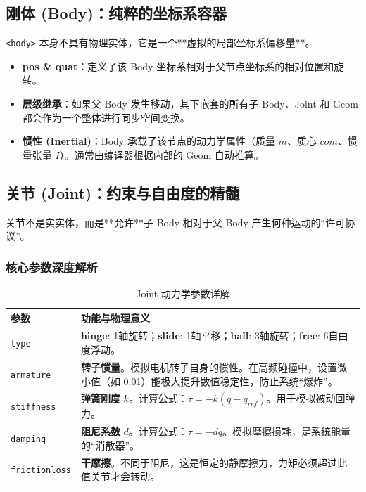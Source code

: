 \documentclass[11pt,a4paper]{book}
\begin{document}
\subsection{刚体 (Body)：纯粹的坐标系容器}
\texttt{<body>} 本身不具有物理实体，它是一个**虚拟的局部坐标系偏移量**。
\begin{itemize}
    \item \textbf{pos \& quat}：定义了该 Body 坐标系相对于父节点坐标系的相对位置和旋转。
    \item \textbf{层级继承}：如果父 Body 发生移动，其下嵌套的所有子 Body、Joint 和 Geom 都会作为一个整体进行同步空间变换。
    \item \textbf{惯性 (Inertial)}：Body 承载了该节点的动力学属性（质量 $m$、质心 $com$、惯量张量 $I$）。通常由编译器根据内部的 Geom 自动推算。
\end{itemize}



\subsection{关节 (Joint)：约束与自由度的精髓}
关节不是实实体，而是**允许**子 Body 相对于父 Body 产生何种运动的“许可协议”。

\subsubsection{核心参数深度解析}

\begin{longtable}{lp{10cm}}
\caption{Joint 动力学参数详解} \\
\toprule
\textbf{参数} & \textbf{功能与物理意义} \\ \midrule
\texttt{type} & \textbf{hinge}: 1轴旋转；\textbf{slide}: 1轴平移；\textbf{ball}: 3轴旋转；\textbf{free}: 6自由度浮动。 \\
\texttt{armature} & \textbf{转子惯量}。模拟电机转子自身的惯性。在高频碰撞中，设置微小值（如 0.01）能极大提升数值稳定性，防止系统“爆炸”。 \\
\texttt{stiffness} & \textbf{弹簧刚度} $k$。计算公式：$\tau = -k(q - q_{ref})$。用于模拟被动回弹力。 \\
\texttt{damping} & \textbf{阻尼系数} $d$。计算公式：$\tau = -d\dot{q}$。模拟摩擦损耗，是系统能量的“消散器”。 \\
\texttt{frictionloss} & \textbf{干摩擦}。不同于阻尼，这是恒定的静摩擦力，力矩必须超过此值关节才会转动。 \\
\bottomrule
\end{longtable}
\end{document}
